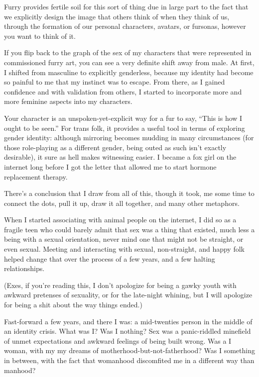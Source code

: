 Furry provides fertile soil for this sort of thing due in large part to the fact that we explicitly design the image that others think of when they think of us, through the formation of our personal characters, avatars, or fursonas, however you want to think of it.

If you flip back to the graph of the sex of my characters that were represented in commissioned furry art, you can see a very definite shift away from male.  At first, I shifted from masculine to explicitly genderless, because my identity had become so painful to me that my instinct was to escape.  From there, as I gained confidence and with validation from others, I started to incorporate more and more feminine aspects into my characters.

Your character is an unspoken-yet-explicit way for a fur to say, ``This is how I ought to be seen.''  For trans folk, it provides a useful tool in terms of exploring gender identity: although mirroring becomes mudding in many circumstances (for those role-playing as a different gender, being outed as such isn't exactly desirable), it sure as hell makes witnessing easier.  I became a fox girl on the internet long before I got the letter that allowed me to start hormone replacement therapy.

There's a conclusion that I draw from all of this, though it took, me some time to connect the dots, pull it up, draw it all together, and many other metaphors.

When I started associating with animal people on the internet, I did so as a fragile teen who could barely admit that sex was a thing that existed, much less a being with a sexual orientation, never mind one that might not be straight, or even sexual.  Meeting and interacting with sexual, non-straight, and happy folk helped change that over the process of a few years, and a few halting relationships.

(Exes, if you're reading this, I don't apologize for being a gawky youth with awkward pretenses of sexuality, or for the late-night whining, but I will apologize for being a shit about the way things ended.)

Fast-forward a few years, and there I was: a mid-twenties person in the middle of an identity crisis.  What was I?  Was I nothing?  Sex was a panic-riddled minefield of unmet expectations and awkward feelings of being built wrong.  Was a I woman, with my my dreams of motherhood-but-not-fatherhood?  Was I something in between, with the fact that womanhood discomfited me in a different way than manhood?

